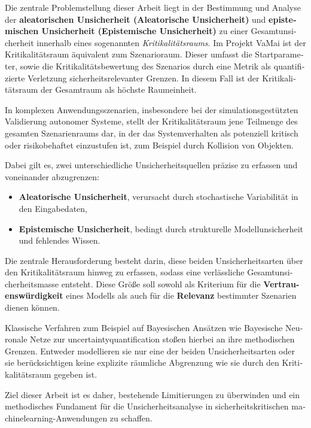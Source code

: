 \begin{otherlanguage}{ngerman}
Die zentrale Problemstellung dieser Arbeit liegt in der Bestimmung und Analyse der \textbf{aleatorischen Unsicherheit (\gls{Aleatorische Unsicherheit})} und \textbf{epistemischen Unsicherheit (\gls{Epistemische Unsicherheit})} zu einer Gesamtunsicherheit innerhalb eines sogenannten \emph{Kritikalitätsraums}. Im Projekt VaMai ist der Kritikalitätsraum äquivalent zum Szenarioraum. Dieser umfasst die Startparameter, sowie die Kritikalitätsbewertung des Szenarios durch eine Metrik als quantifizierte Verletzung sicherheitsrelevanter Grenzen. In diesem Fall ist der Kritikalitätsraum der Gesamtraum als höchste Raumeinheit. \newline


In komplexen Anwendungsszenarien, insbesondere bei der simulationsgestützten Validierung autonomer Systeme, stellt der Kritikalitätsraum jene Teilmenge des gesamten Szenarienraums dar, in der das Systemverhalten als potenziell kritisch oder risikobehaftet einzustufen ist, zum Beispiel durch Kollision von Objekten.\newline

Dabei gilt es, zwei unterschiedliche Unsicherheitsquellen präzise zu erfassen und voneinander abzugrenzen:

\begin{itemize}
  \item \textbf{\gls{Aleatorische Unsicherheit}}, verursacht durch stochastische Variabilität in den Eingabedaten,
  \item \textbf{\gls{Epistemische Unsicherheit}}, bedingt durch strukturelle Modellunsicherheit und fehlendes Wissen.
\end{itemize}

Die zentrale Herausforderung besteht darin, diese beiden Unsicherheitsarten über den Kritikalitätsraum hinweg zu erfassen, sodass eine verlässliche Gesamtunsicherheitsmasse entsteht. Diese Größe soll sowohl als Kriterium für die \textbf{Vertrauenswürdigkeit} eines Modells als auch für die \textbf{Relevanz} bestimmter Szenarien dienen können.\newline

Klassische Verfahren zum Beispiel auf Bayesischen Ansätzen wie Bayesische Neuronale Netze zur \gls{uncertaintyquantification} stoßen hierbei an ihre methodischen Grenzen. Entweder modellieren sie nur eine der beiden Unsicherheitsarten oder sie berücksichtigen keine explizite räumliche Abgrenzung wie sie durch den Kritikalitätsraum gegeben ist.\newline

Ziel dieser Arbeit ist es daher, bestehende Limitierungen zu überwinden und ein methodisches Fundament für die Unsicherheitsanalyse in sicherheitskritischen \gls{machinelearning}-Anwendungen zu schaffen.
\end{otherlanguage}
